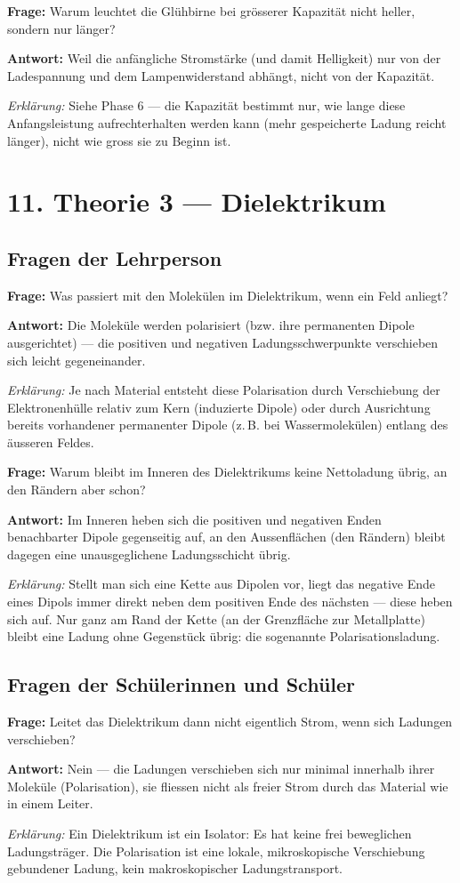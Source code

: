 \documentclass[11pt,a4paper]{article}
\newcommand{\Frage}[1]{\textbf{Frage:} #1\par}
\newcommand{\Antwort}[1]{\textbf{Antwort:} #1\par}
\newcommand{\Erklaerung}[1]{\textit{Erklärung:} #1}
\newcommand{\FrageBlock}[3]{\Frage{#1}\Antwort{#2}\Erklaerung{#3}\vspace{0.6em}}
\begin{document}
\FrageBlock{Warum leuchtet die Glühbirne bei grösserer Kapazität nicht heller, sondern nur länger?}
{Weil die anfängliche Stromstärke (und damit Helligkeit) nur von der Ladespannung und dem Lampenwiderstand abhängt, nicht von der Kapazität.}
{Siehe Phase 6 --- die Kapazität bestimmt nur, wie lange diese Anfangsleistung aufrechterhalten werden kann (mehr gespeicherte Ladung reicht länger), nicht wie gross sie zu Beginn ist.}

\section*{11. Theorie 3 --- Dielektrikum}

\subsection*{Fragen der Lehrperson}

\FrageBlock{Was passiert mit den Molekülen im Dielektrikum, wenn ein Feld anliegt?}
{Die Moleküle werden polarisiert (bzw. ihre permanenten Dipole ausgerichtet) --- die positiven und negativen Ladungsschwerpunkte verschieben sich leicht gegeneinander.}
{Je nach Material entsteht diese Polarisation durch Verschiebung der Elektronenhülle relativ zum Kern (induzierte Dipole) oder durch Ausrichtung bereits vorhandener permanenter Dipole (z.\,B. bei Wassermolekülen) entlang des äusseren Feldes.}

\FrageBlock{Warum bleibt im Inneren des Dielektrikums keine Nettoladung übrig, an den Rändern aber schon?}
{Im Inneren heben sich die positiven und negativen Enden benachbarter Dipole gegenseitig auf, an den Aussenflächen (den Rändern) bleibt dagegen eine unausgeglichene Ladungsschicht übrig.}
{Stellt man sich eine Kette aus Dipolen vor, liegt das negative Ende eines Dipols immer direkt neben dem positiven Ende des nächsten --- diese heben sich auf. Nur ganz am Rand der Kette (an der Grenzfläche zur Metallplatte) bleibt eine Ladung ohne Gegenstück übrig: die sogenannte Polarisationsladung.}

\subsection*{Fragen der Schülerinnen und Schüler}

\FrageBlock{Leitet das Dielektrikum dann nicht eigentlich Strom, wenn sich Ladungen verschieben?}
{Nein --- die Ladungen verschieben sich nur minimal innerhalb ihrer Moleküle (Polarisation), sie fliessen nicht als freier Strom durch das Material wie in einem Leiter.}
{Ein Dielektrikum ist ein Isolator: Es hat keine frei beweglichen Ladungsträger. Die Polarisation ist eine lokale, mikroskopische Verschiebung gebundener Ladung, kein makroskopischer Ladungstransport.}
\end{document}
